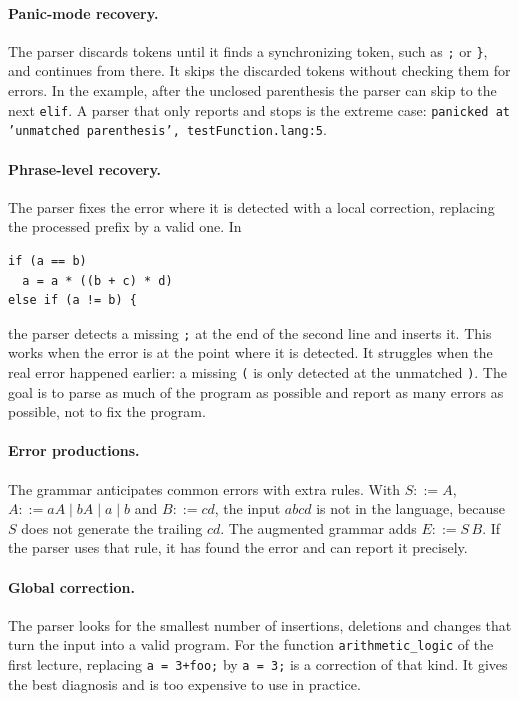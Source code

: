 \paragraph{Panic-mode recovery.} The parser discards tokens until it finds a
synchronizing token, such as \texttt{;} or \texttt{\}}, and continues from there.
It skips the discarded tokens without checking them for errors. In the
example, after the unclosed parenthesis the parser can skip to the next
\texttt{elif}. A parser that only reports and stops is the extreme case:
\texttt{panicked at 'unmatched parenthesis', testFunction.lang:5}.

\paragraph{Phrase-level recovery.} The parser fixes the error where it is
detected with a local correction, replacing the processed prefix by a valid
one. In
\begin{lstlisting}
if (a == b)
  a = a * ((b + c) * d)
else if (a != b) {
\end{lstlisting}
the parser detects a missing \texttt{;} at the end of the second line and
inserts it. This works when the error is at the point where it is detected.
It struggles when the real error happened earlier: a missing \texttt{(} is
only detected at the unmatched \texttt{)}. The goal is to parse as much of the
program as possible and report as many errors as possible, not to fix the
program.

\paragraph{Error productions.} The grammar anticipates common errors with extra
rules. With $S ::= A$, $A ::= aA \mid bA \mid a \mid b$ and $B ::= cd$, the input
$abcd$ is not in the language, because $S$ does not generate the trailing
$cd$. The augmented grammar adds $E ::= S\,B$. If the parser uses that rule,
it has found the error and can report it precisely.

\paragraph{Global correction.} The parser looks for the smallest number of
insertions, deletions and changes that turn the input into a valid program.
For the function \texttt{arithmetic\_logic} of the first lecture, replacing
\texttt{a = 3+foo;} by \texttt{a = 3;} is a correction of that kind. It gives
the best diagnosis and is too expensive to use in practice.

